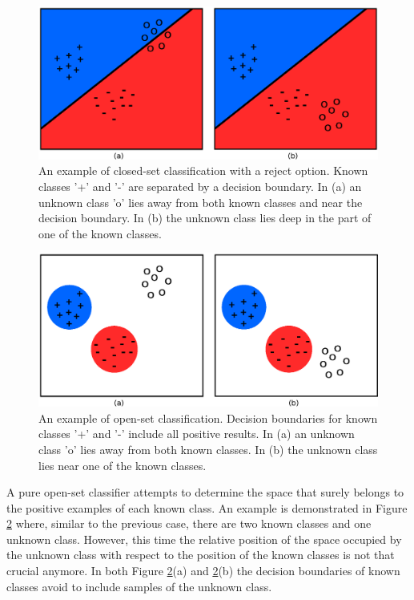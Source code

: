 \begin{figure}[t]
	\begin{center}
    	\includegraphics[scale=0.70]{Figures/closed-set_classification_schema.eps}
		\caption{An example of closed-set classification with a reject option. Known classes '+' and '-' are separated by a decision boundary. In (a) an unknown class 'o' lies away from both known classes and near the decision boundary. In (b) the unknown class lies deep in the part of one of the known classes.}
		\label{chap:openset:fig:closed_set_classification}
	\end{center}
\end{figure}


\begin{figure}[t]
	\begin{center}
    	\includegraphics[scale=0.70]{Figures/open-set_classification_schema.eps}
		\caption{An example of open-set classification. Decision boundaries for known classes '+' and '-' include all positive results. In (a) an unknown class 'o' lies away from both known classes. In (b) the unknown class lies near one of the known classes.}
		\label{chap:openset:fig:open_set_classification}
	\end{center}
\end{figure}

A pure open-set classifier attempts to determine the space that surely belongs to the positive examples of each known class. An example is demonstrated in Figure \ref{chap:openset:fig:open_set_classification} where, similar to the previous case, there are two known classes and one unknown class. However, this time the relative position of the space occupied by the unknown class with respect to the position of the known classes is not that crucial anymore. In both Figure \ref{chap:openset:fig:open_set_classification}(a) and \ref{chap:openset:fig:open_set_classification}(b) the decision boundaries of known classes avoid to include samples of the unknown class.


